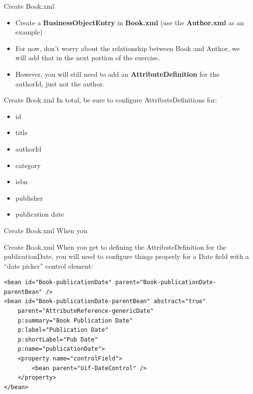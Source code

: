 \documentclass[xcolor=dvipsnames,14pt,professionalfonts]{beamer}
\begin{document}
\begin{frame}{Create Book.xml}
  \begin{itemize}
    \item Create a \textbf{BusinessObjectEntry} in \textbf{Book.xml} (use the \textbf{Author.xml} as an example)
    \item For now, don’t worry about the relationship between Book and Author, we will add that in the next portion of the exercise.
    \item However, you will still need to add an \textbf{AttributeDefinition}
      for the authorId, just not the author.
    \end{itemize}
  \end{frame}
  
\begin{frame}{Create Book.xml}
  In total, be sure to configure AttributeDefinitions for:
  \begin{itemize}
  \item id
  \item title
  \item authorId
  \item category
  \item isbn
  \item publisher
  \item publication date
\end{itemize}
\end{frame}

\begin{frame}[fragile]{Create Book.xml}
  When you 
\end{frame}

\begin{frame}[fragile]{Create Book.xml}
 When you get to defining the AttributeDefinition for the
 publicationDate, you will need to configure things properly for a
 Date field with a “date picker” control element:
 
 \begin{verbatim}
<bean id="Book-publicationDate" parent="Book-publicationDate-parentBean" />
<bean id="Book-publicationDate-parentBean" abstract="true" 
    parent="AttributeReference-genericDate"
    p:summary="Book Publication Date"
    p:label="Publication Date"
    p:shortLabel="Pub Date"
    p:name="publicationDate">
    <property name="controlField">
        <bean parent="Uif-DateControl" />
    </property>
</bean>
\end{verbatim}
\end{frame}
\end{document}
